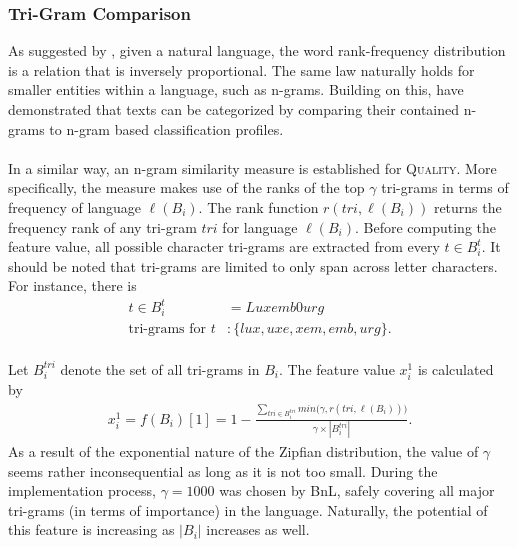 \documentclass{jdmdh}
\begin{document}
\subsubsection{Tri-Gram Comparison}
As suggested by \citet{zipf}, given a natural language, the word rank-frequency distribution is a relation that is inversely proportional. The same law naturally holds for smaller entities within a language, such as n-grams. Building on this, \citet{cavnar} have demonstrated that texts can be categorized by comparing their contained n-grams to n-gram based classification profiles. \\ \\
In a similar way, an n-gram similarity measure is established for \textsc{Quality}. More specifically, the measure makes use of the ranks of the top $\gamma$ tri-grams in terms of frequency of language $\ell(B_i)$. The rank function $r(tri, \ell(B_i))$ returns the frequency rank of any tri-gram $tri$ for language $\ell(B_i)$. Before computing the feature value, all possible character tri-grams are extracted from every $t\!\in\!B_i^t$. It should be noted that tri-grams are limited to only span across letter characters. For instance, there is
\begin{align}
    t\!\in\!B_i^t &= Luxemb0urg \nonumber \\
    \text{tri-grams for }t &: \{lux, uxe, xem, emb, urg\}.
\end{align}
\\
Let $B^{tri}_i$ denote the set of all tri-grams in $B_i$. The feature value $x^1_i$ is calculated by
\begin{align} \label{formula:x2}
    x^1_i = f(B_i)[1] = 1\!-\!\frac{\sum_{tri\in B_i^{tri}}min\big(\gamma, r(tri, \ell(B_i))\big)}{\gamma\times|B_i^{tri}|}.
\end{align}
As a result of the exponential nature of the Zipfian distribution, the value of $\gamma$ seems rather inconsequential as long as it is not too small. During the implementation process, $\gamma\!=\!1000$ was chosen by BnL, safely covering all major tri-grams (in terms of importance) in the language. Naturally, the potential of this feature is increasing as $|B_i|$ increases as well.
\end{document}
